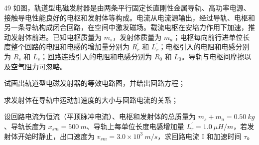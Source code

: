 \begin{problem}[第32届全国中学生物理竞赛决赛]{49}
如图，轨道型电磁发射器是由两条平行固定长直刚性金属导轨、高功率电源、接触导电性能良好的电枢和发射体等构成。电流从电流源输出，经过导轨、电枢和另一条导轨构成闭合回路，在空间中激发磁场。载流电枢在安培力作用下加速，推动发射体前进。已知电枢质量为 $m_{s}$，发射体质量为 $m_{a}$；电枢每向前行进单位长度整个回路的电阻和电感的增加量分别为 $R_{r}^{\prime}$ 和 $L_{r}^{\prime}$；电枢引入的电阻和电感分别为 $R_{s}$ 和 $L_{s}$；回路连线引入的电阻和电感分别为 $R_{0}$ 和 $L_{0}$。导轨与电枢间摩擦以及空气阻力可忽略。
\begin{subproblem}
试画出轨道型电磁发射器的等效电路图，并给出回路方程；
\end{subproblem}
\begin{subproblem}
求发射体在导轨中运动加速度的大小与回路电流的关系；
\end{subproblem}
\begin{subproblem}
设回路电流为恒流（平顶脉冲电流）、电枢和发射体的总质量为 $m_{s}+m_{a}=0.50\ kg$、导轨长度为 $x_{sm}=500\ m$、导轨上每单位长度电感增加量 $L_{r}^{\prime}=1.0\ \mu H/m$，若发射体开始时静止，出口速度为 $v_{sm}=3.0\times10^{3}\ m/s$，求回路电流 I 和加速时间 $\tau$。
\end{subproblem}
\end{problem}